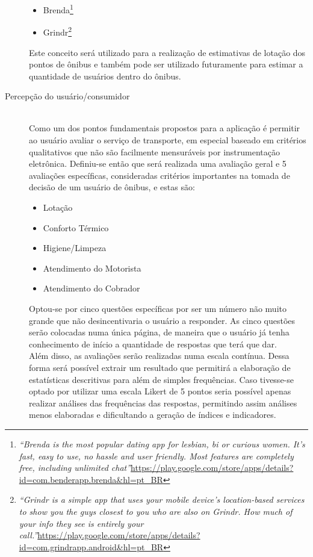 \begin{description}
\begin{itemize}
	    \item Brenda\footnote{\textit{``Brenda is the most popular dating app for lesbian, bi or curious women. It's fast, easy to use, no hassle and user friendly. Most features are completely free, including unlimited chat''}\url{https://play.google.com/store/apps/details?id=com.benderapp.brenda&hl=pt_BR}}
	    \item Grindr\footnote{\textit{``Grindr is a simple app that uses your mobile device’s location-based services to show you the guys closest to you who are also on Grindr. How much of your info they see is entirely your call.''}\url{https://play.google.com/store/apps/details?id=com.grindrapp.android&hl=pt_BR}}
	    \end{itemize}
	    Este conceito será utilizado para a realização de estimativas de lotação dos pontos de ônibus e também pode ser utilizado futuramente para estimar a quantidade de usuários dentro do ônibus.%
%
\clearpage
	\item[Percepção do usuário/consumidor]\cite{Lai1995,Almeida2011,Almeida2007,andrade2008constructos} \hfill \\
	    Como um dos pontos fundamentais propostos para a aplicação é permitir ao usuário avaliar o serviço de transporte, em especial baseado em critérios qualitativos que não são facilmente mensuráveis por instrumentação eletrônica. Definiu-se então que será realizada uma avaliação geral e 5 avaliações específicas, consideradas critérios importantes na tomada de decisão de um usuário de ônibus, e estas são:
	    \begin{itemize}
	    \item Lotação
	    \item Conforto Térmico
	    \item Higiene/Limpeza
	    \item Atendimento do Motorista
	    \item Atendimento do Cobrador
	    \end{itemize}
	    Optou-se por cinco questões específicas por ser um número não muito grande que não desincentivaria o usuário a responder. As cinco questões serão colocadas numa única página, de maneira que o usuário já tenha conhecimento de início a quantidade de respostas que terá que dar.\\
	    Além disso, as avaliações serão realizadas numa escala contínua. Dessa forma será possível extrair um resultado que permitirá a elaboração de estatísticas descritivas para além de simples frequências. Caso tivesse-se optado por utilizar uma escala Likert de 5 pontos seria possível apenas realizar análises das frequências das respostas, permitindo assim análises menos elaboradas e dificultando a geração de índices e indicadores.\cite{favero2009}
\end{description}
